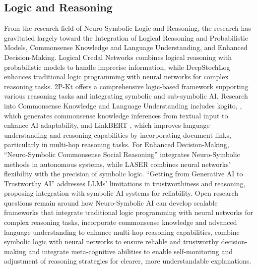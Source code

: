 \documentclass[hf]{ceurart}
\begin{document}
\subsection{Logic and Reasoning}\label{subsec:disc_logic}
From the research field of Neuro-Symbolic Logic and Reasoning, the research has gravitated largely toward the Integration of Logical Reasoning and Probabilistic Models, Commonsense Knowledge and Language Understanding, and Enhanced Decision-Making. Logical Credal Networks \cite{Qian2021} combines logical reasoning with probabilistic models to handle imprecise information, while DeepStochLog \cite{Winters2021} enhances traditional logic programming with neural networks for complex reasoning tasks. 2P-Kt \cite{Ciatto2021} offers a comprehensive logic-based framework supporting various reasoning tasks and integrating symbolic and sub-symbolic AI. Research into Commonsense Knowledge and Language Understanding includes kogito, \cite{Ismayilzada2022}, which generates commonsense knowledge inferences from textual input to enhance AI adaptability, and LinkBERT \cite{Yasunaga2022}, which improves language understanding and reasoning capabilities by incorporating document links, particularly in multi-hop reasoning tasks. For Enhanced Decision-Making, \enquote{Neuro-Symbolic Commonsense Social Reasoning} \cite{Chanin2023} integrates Neuro-Symbolic methods in autonomous systems, while LASER \cite{Huang2023} combines neural networks' flexibility with the precision of symbolic logic. \enquote{Getting from Generative AI to Trustworthy AI} \cite{Lenat2023} addresses LLMs' limitations in trustworthiness and reasoning, proposing integration with symbolic AI systems for reliability. Open research questions remain around how Neuro-Symbolic AI can develop scalable frameworks that integrate traditional logic programming with neural networks for complex reasoning tasks, incorporate commonsense knowledge and advanced language understanding to enhance multi-hop reasoning capabilities, combine symbolic logic with neural networks to ensure reliable and trustworthy decision-making and integrate meta-cognitive abilities to enable self-monitoring and adjustment of reasoning strategies for clearer, more understandable explanations.
\end{document}
